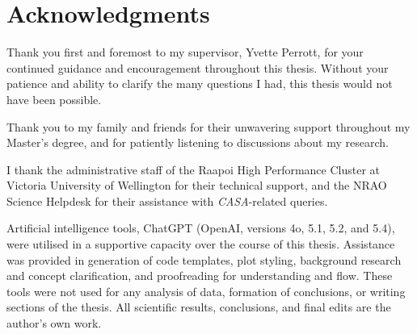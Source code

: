 

\clearpage
\section*{Acknowledgments}
{}

\begin{instructional}
    \noindent
    Thank you first and foremost to my supervisor, Yvette Perrott, for your continued guidance and encouragement throughout this thesis. Without your patience and ability to clarify the many questions I had, this thesis would not have been possible.

    Thank you to my family and friends for their unwavering support throughout my Master's degree, and for patiently listening to discussions about my research.

    I thank the administrative staff of the Raapoi High Performance Cluster at Victoria University of Wellington for their technical support, and the NRAO Science Helpdesk for their assistance with \textit{CASA}-related queries.

    Artificial intelligence tools, ChatGPT (OpenAI, versions 4o, 5.1, 5.2, and 5.4), were utilised in a supportive capacity over the course of this thesis. Assistance was provided in generation of code templates, plot styling, background research and concept clarification, and proofreading for understanding and flow.
    These tools were not used for any analysis of data, formation of conclusions, or writing sections of the thesis. All scientific results, conclusions, and final edits are the author's own work. 
\end{instructional}



\clearpage
\tableofcontents
\newpage

